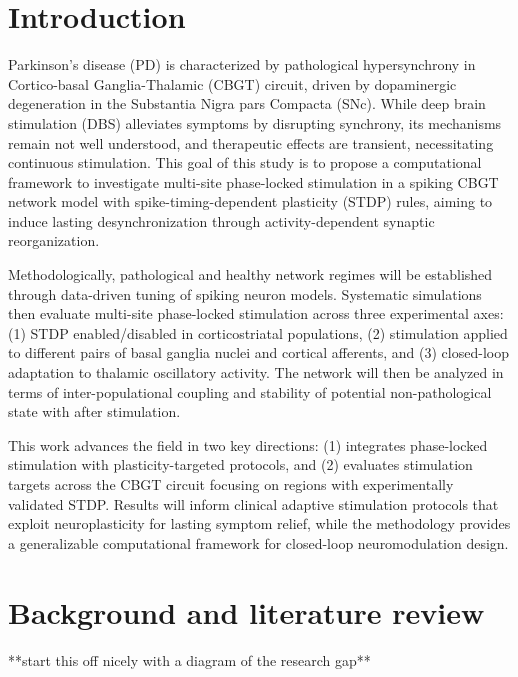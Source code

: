 \tableofcontents
\newpage

\section{Introduction}
Parkinson's disease (PD) is characterized by pathological hypersynchrony in Cortico-basal Ganglia-Thalamic
(CBGT) circuit, driven by dopaminergic degeneration in the Substantia Nigra pars Compacta (SNc). While deep
brain stimulation (DBS) alleviates symptoms by disrupting synchrony, its mechanisms remain not well understood,
and therapeutic effects are transient, necessitating continuous stimulation. This goal of this study is to propose
a computational framework to investigate multi-site phase-locked stimulation in a spiking CBGT network model with
spike-timing-dependent plasticity (STDP) rules, aiming to induce lasting desynchronization through activity-dependent
synaptic reorganization.

Methodologically, pathological and healthy network regimes will be established through data-driven tuning of spiking
neuron models.
Systematic simulations then evaluate multi-site phase-locked stimulation across three experimental axes:
(1) STDP enabled/disabled in corticostriatal populations,
(2) stimulation applied to different pairs of basal ganglia nuclei and cortical afferents, and
(3) closed-loop adaptation to thalamic oscillatory activity.
The network will then be analyzed in terms of inter-populational coupling and stability of potential non-pathological
state with after stimulation.

This work advances the field in two key directions:
(1) integrates phase-locked stimulation with plasticity-targeted protocols, and
(2) evaluates stimulation targets across the CBGT circuit focusing on regions with experimentally validated STDP.
Results will inform clinical adaptive stimulation protocols that exploit neuroplasticity for lasting symptom relief,
while the methodology provides a generalizable computational framework for closed-loop neuromodulation design.

\section{Background and literature review}
**start this off nicely with a diagram of the research gap**

